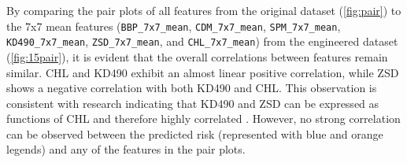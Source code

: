 \documentclass[a4paper,11pt]{report}
\begin{document}
By comparing the pair plots of all features from the original dataset (\ref{fig:pair}) to the 7x7 mean features (\texttt{BBP\_7x7\_mean}, \texttt{CDM\_7x7\_mean}, \texttt{SPM\_7x7\_mean}, \texttt{KD490\_7x7\_mean}, \texttt{ZSD\_7x7\_mean}, and \texttt{CHL\_7x7\_mean}) from the engineered dataset (\ref{fig:15pair}), it is evident that the overall correlations between features remain similar. CHL and KD490 exhibit an almost linear positive correlation, while ZSD shows a negative correlation with both KD490 and CHL. This observation is consistent with research indicating that KD490 and ZSD can be expressed as functions of CHL and therefore highly correlated \citep{MOREL200769}. However, no strong correlation can be observed between the predicted risk (represented with blue and orange legends) and any of the features in the pair plots.
\end{document}
